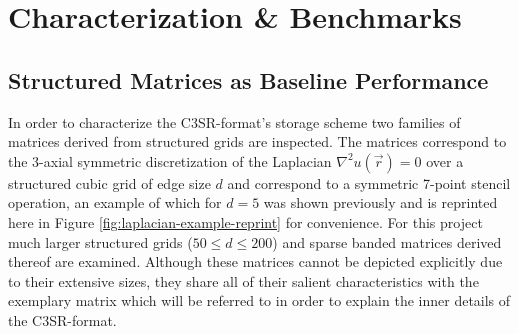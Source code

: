 \chapter{Characterization \& Benchmarks}

  \section{Structured Matrices as Baseline Performance}

    In order to characterize the C3SR-format's storage scheme two families of matrices derived from structured grids are
    inspected. The matrices correspond to the 3-axial symmetric discretization of the Laplacian $\nabla^2 u(\vec{r}) =
    0$ over a structured cubic grid of edge size $d$ and correspond to a symmetric 7-point stencil operation, an example
    of which for $d = 5$ was shown previously and is reprinted here in Figure \ref{fig:laplacian-example-reprint} for
    convenience. For this project much larger structured grids ($50 \leq d \leq 200$) and sparse banded matrices
    derived thereof are examined. Although these matrices cannot be depicted explicitly due to their extensive sizes,
    they share all of their salient characteristics with the exemplary matrix which will be referred to in order to
    explain the inner details of the C3SR-format.

